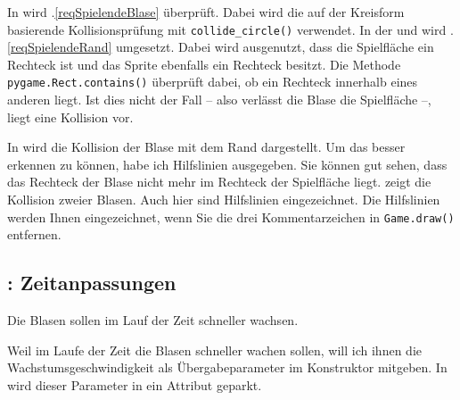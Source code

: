 
In  wird .\ref{reqSpielendeBlase} überprüft. Dabei wird die auf der Kreisform basierende Kollisionsprüfung mit \texttt{collide\_circle()} verwendet. In der  und  wird .\ref{reqSpielendeRand} umgesetzt. Dabei wird ausgenutzt, dass die Spielfläche ein Rechteck ist und das Sprite ebenfalls ein Rechteck besitzt. Die Methode \texttt{pygame.Rect.contains()} überprüft dabei, ob ein Rechteck innerhalb eines anderen liegt. Ist dies nicht der Fall -- also verlässt die Blase die Spielfläche --, liegt eine Kollision vor.


In  wird die Kollision der Blase mit dem Rand dargestellt. Um das besser erkennen zu können, habe ich Hilfslinien ausgegeben. Sie können gut sehen, dass das Rechteck der Blase nicht mehr im Rechteck der Spielfläche liegt.  zeigt die Kollision zweier Blasen. Auch hier sind Hilfslinien eingezeichnet. Die Hilfslinien werden Ihnen eingezeichnet, wenn Sie die drei Kommentarzeichen in \texttt{Game.draw()} entfernen.



\subsection{: Zeitanpassungen}
	Die Blasen sollen im Lauf der Zeit schneller wachsen.
\er

Weil im Laufe der Zeit die Blasen schneller wachen sollen, will ich ihnen die Wachstumsgeschwindigkeit als Übergabeparameter im Konstruktor mitgeben. In  wird dieser Parameter in ein Attribut geparkt.


